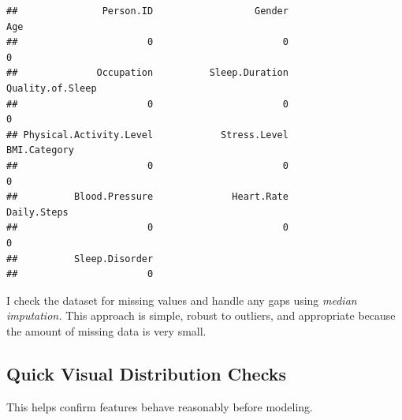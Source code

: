 \documentclass[
]{article}
\newenvironment{Shaded}{\begin{snugshade}}{\end{snugshade}}
\newcommand{\AttributeTok}[1]{\textcolor[rgb]{0.13,0.29,0.53}{#1}}
\newcommand{\CommentTok}[1]{\textcolor[rgb]{0.56,0.35,0.01}{\textit{#1}}}
\newcommand{\ConstantTok}[1]{\textcolor[rgb]{0.56,0.35,0.01}{#1}}
\newcommand{\ControlFlowTok}[1]{\textcolor[rgb]{0.13,0.29,0.53}{\textbf{#1}}}
\newcommand{\FunctionTok}[1]{\textcolor[rgb]{0.13,0.29,0.53}{\textbf{#1}}}
\newcommand{\NormalTok}[1]{#1}
\newcommand{\OtherTok}[1]{\textcolor[rgb]{0.56,0.35,0.01}{#1}}
\newcommand{\SpecialCharTok}[1]{\textcolor[rgb]{0.81,0.36,0.00}{\textbf{#1}}}
\newcommand{\StringTok}[1]{\textcolor[rgb]{0.31,0.60,0.02}{#1}}
\begin{document}
\begin{Shaded}
\end{Shaded}

\begin{verbatim}
##               Person.ID                  Gender                     Age 
##                       0                       0                       0 
##              Occupation          Sleep.Duration        Quality.of.Sleep 
##                       0                       0                       0 
## Physical.Activity.Level            Stress.Level            BMI.Category 
##                       0                       0                       0 
##          Blood.Pressure              Heart.Rate             Daily.Steps 
##                       0                       0                       0 
##          Sleep.Disorder 
##                       0
\end{verbatim}

I check the dataset for missing values and handle any gaps using
\emph{median imputation.} This approach is simple, robust to outliers,
and appropriate because the amount of missing data is very small.

\subsection{Quick Visual Distribution
Checks}\label{quick-visual-distribution-checks}

This helps confirm features behave reasonably before modeling.
\end{document}
